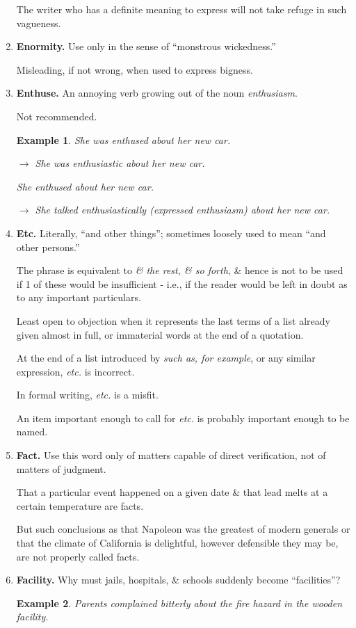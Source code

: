 \documentclass{article}
\newtheorem{example}{Example}
\begin{document}
\begin{enumerate}
	The writer who has a definite meaning to express will not take refuge in such vagueness.
	\item {\bf Enormity.} Use only in the sense of ``monstrous wickedness.''
	
	Misleading, if not wrong, when used to express bigness.
	\item {\bf Enthuse.} An annoying verb growing out of the noun {\it enthusiasm}.
	
	Not recommended.
	\begin{example}
		She was enthused about her new car.
		
		$\to$ She was enthusiastic about her new car.
		
		She enthused about her new car.
		
		$\to$ She talked enthusiastically (expressed enthusiasm) about her new car.
	\end{example}
	\item {\bf Etc.} Literally, ``and other things''; sometimes loosely used to mean ``and other persons.''
	
	The phrase is equivalent to {\it \& the rest, \& so forth}, \& hence is not to be used if 1 of these would be insufficient - i.e., if the reader would be left in doubt as to any important particulars.
	
	Least open to objection when it represents the last terms of a list already given almost in full, or immaterial words at the end of a quotation.
	
	At the end of a list introduced by {\it such as, for example}, or any similar expression, {\it etc.} is incorrect.
	
	In formal writing, {\it etc.} is a misfit.
	
	An item important enough to call for {\it etc.} is probably important enough to be named.
	\item {\bf Fact.} Use this word only of matters capable of direct verification, not of matters of judgment.
	
	That a particular event happened on a given date \& that lead melts at a certain temperature are facts.
	
	But such conclusions as that Napoleon was the greatest of modern generals or that the climate of California is delightful, however defensible they may be, are not properly called facts.
	\item {\bf Facility.} Why must jails, hospitals, \& schools suddenly become ``facilities''?
	\begin{example}
		Parents complained bitterly about the fire hazard in the wooden facility.
		

\end{example}
\end{enumerate}
\end{document}
